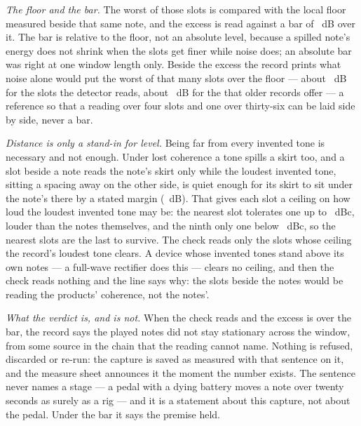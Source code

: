 \documentclass[11pt,a4paper]{article}
\begin{document}
\emph{The floor and the bar.} The worst of those slots is compared with
the local floor measured beside that same note, and the excess is read
against a bar of \imdBarDB{}~dB over it. The bar is relative to the floor,
not an absolute level, because a spilled note's energy does not shrink
when the slots get finer while noise does; an absolute bar was right at
one window length only. Beside the excess the record prints what noise
alone would put the worst of that many slots over the floor --- about
\imdNoiseExcessDetectorDB{}~dB for the \imdDetectorBinCount{} slots the
detector reads, about \imdNoiseExcessLegacyDB{}~dB for the
\imdLegacyBinCount{} that older records offer --- a reference so that a
reading over four slots and one over thirty-six can be laid side by side,
never a bar.

\emph{Distance is only a stand-in for level.} Being far from every
invented tone is necessary and not enough. Under lost coherence a tone
spills a skirt too, and a slot beside a note reads the note's skirt only
while the loudest invented tone, sitting a spacing away on the other side,
is quiet enough for its skirt to sit under the note's there by a stated
margin (\imdProductSkirtMarginDB{}~dB). That gives each slot a ceiling on
how loud the loudest invented tone may be: the nearest slot tolerates one
up to \imdCeilingNearestDBc{}~dBc, louder than the notes themselves, and
the ninth only one below \imdCeilingWidestDBc{}~dBc, so the nearest slots
are the last to survive. The check reads only the slots whose ceiling the
record's loudest tone clears. A device whose invented tones stand above
its own notes --- a full-wave rectifier does this --- clears no ceiling,
and then the check reads nothing and the line says why: the slots beside
the notes would be reading the products' coherence, not the notes'.

\emph{What the verdict is, and is not.} When the check reads and the
excess is over the bar, the record says the played notes did not stay
stationary across the window, from some source in the chain that the
reading cannot name. Nothing is refused, discarded or re-run: the
capture is saved as measured with that sentence on it, and the measure
sheet announces it the moment the number exists. The sentence never
names a stage --- a pedal with a dying battery moves a note over twenty
seconds as surely as a rig --- and it is a statement about this capture,
not about the pedal. Under the bar it says the premise held.
\end{document}
